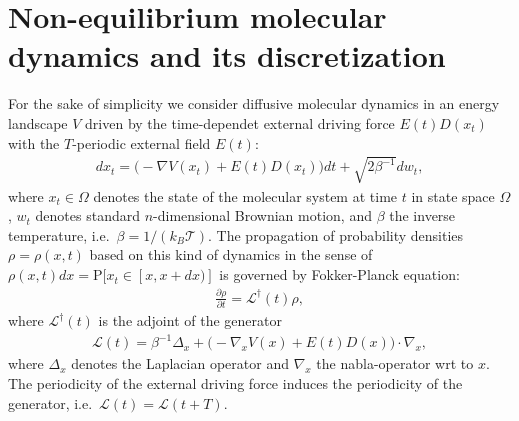 \documentclass[aps, pre, preprint,unsortedaddress,a4paper,onecolumn]{revtex4}
\newcommand{\vect}[1]{#1}
\newcommand{\ml}[0]{\mathcal {L}}
\newcommand{\prob}{\textrm{P}}
\begin{document}
\section{Non-equilibrium molecular dynamics and its discretization}
\label{sec:disc}
For the sake of simplicity we consider diffusive molecular dynamics in an energy landscape $V$ driven by the time-dependet external driving force $E(t)D(x_t)$ with the
$T$-periodic external field $E(t)$:
\begin{align}
  \label{eq:disc-1}
  d\vect x_t = \Big(-\nabla V(\vect x_t) + E(t) D(\vect x_t)\Big)dt + \sqrt{2\beta^{-1}} d\vect w_t, 
\end{align}
where $x_t\in\Omega$ denotes the state of the molecular system at time $t$ in state space $\Omega$, $\vect w_t$ denotes standard $n$-dimensional Brownian motion, and $\beta$ the inverse temperature,
i.e.~$\beta = 1/(k_B\mathcal T)$.
The propagation of probability
densities $\rho=\rho(\vect x,t)$ based on this kind of dynamics in the sense
of $\rho(\vect x,t)dx=\prob[\vect x_t\in [\vect x,\vect x+d\vect x)]$ is governed by
Fokker-Planck equation:
\begin{align}
  \label{eq:disc-fp}
  \frac{\partial \rho}{\partial t} = \ml^\dagger(t) \rho,
\end{align}
where $\ml^\dagger(t)$ is the adjoint of the generator
\begin{align}
  \label{eq:disc-3}
  \ml(t)=\beta^{-1}\Delta_{\vect x}+\Big(-\nabla_x V(\vect x) + E(t)D(\vect x)\Big)\cdot\nabla_{\vect x},
\end{align}
where $\Delta_{\vect x}$ denotes the Laplacian operator and $\nabla_{\vect x}$
the nabla-operator wrt to $\vect x$. 
The periodicity of the external driving force induces the periodicity of the generator,
i.e.~$\ml(t) = \ml(t+T)$.  

\end{document}
